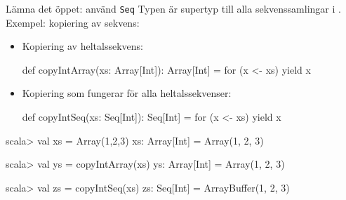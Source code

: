 \begin{Slide}{Lämna det öppet: använd \texttt{Seq}}\SlideFontSmall
  Typen  är supertyp till alla sekvenssamlingar i .
  \pause Exempel: kopiering av sekvens:
  \begin{itemize}
  \item Kopiering av  heltalssekvens:
  \begin{Code}
  def copyIntArray(xs: Array[Int]): Array[Int] = for (x <- xs) yield x
  \end{Code}
  
  \item Kopiering som fungerar för alla heltalssekvenser:
  \begin{Code}
  def copyIntSeq(xs: Seq[Int]): Seq[Int] = for (x <- xs) yield x
  \end{Code}
  \end{itemize}
  \pause
  \begin{REPL}
    scala> val xs = Array(1,2,3)
    xs: Array[Int] = Array(1, 2, 3)
  
    scala> val ys = copyIntArray(xs)
    ys: Array[Int] = Array(1, 2, 3)
  
    scala> val zs = copyIntSeq(xs)
    zs: Seq[Int] = ArrayBuffer(1, 2, 3)
  \end{REPL}
  \end{Slide}
  

